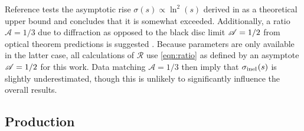 

Reference \cite{Fagundes_2013} tests the asymptotic rise $\sigma(s) \propto \ln^2(s)$ derived in \cite{Froissart_1961}
as a theoretical upper bound and concludes that it is somewhat exceeded. Additionally, a ratio $\mathscr{A} = 1/3$ due to
diffraction as opposed to the black disc limit $\mathscr{A} = 1/2 \kern+0.2pt$ from optical theorem predictions is suggested
\cite{Fagundes_2013}. Because parameters are only available in the latter case, all calculations of $\mathscr{R}$ use \eqref{eqn:ratio}
as defined by an asymptote $\mathscr{A} = 1/2 \kern+0.2pt$ for this work. Data matching $\mathscr{A} = 1/3$ then imply that
$\sigma_{\text{inel}\kern+0.5pt}(s)$ is slightly underestimated, though this is unlikely to significantly influence the overall results.





\subsection{Production}
\label{sub:production}

